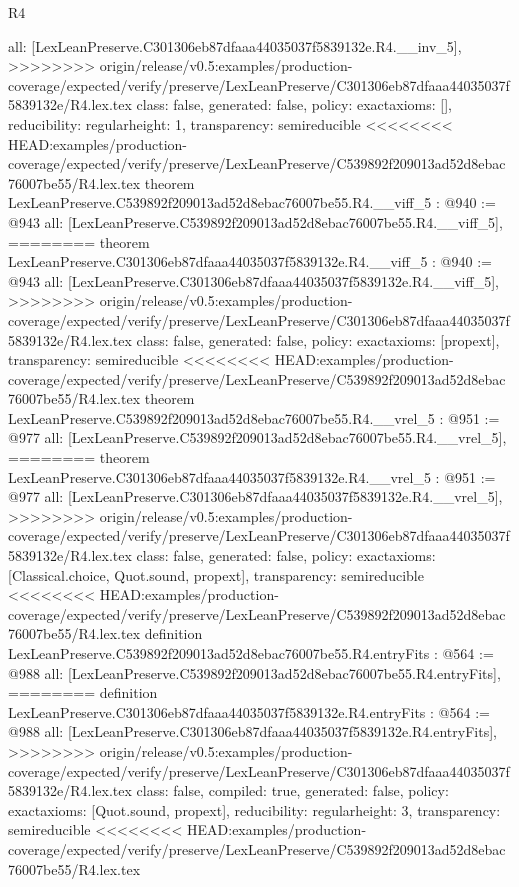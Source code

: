 \begin{lexlean}{R4}
\begin{coremodule}
{{{{{{{{{{{{  all: [LexLeanPreserve.C301306eb87dfaaa44035037f5839132e.R4.__inv_5],
>>>>>>>> origin/release/v0.5:examples/production-coverage/expected/verify/preserve/LexLeanPreserve/C301306eb87dfaaa44035037f5839132e/R4.lex.tex
  class: false,
  generated: false,
  policy: exact{axioms: []},
  reducibility: regular{height: 1},
  transparency: semireducible
}
<<<<<<<< HEAD:examples/production-coverage/expected/verify/preserve/LexLeanPreserve/C539892f209013ad52d8ebac76007be55/R4.lex.tex
theorem LexLeanPreserve.C539892f209013ad52d8ebac76007be55.R4.__viff_5 : @940 := @943 {
  all: [LexLeanPreserve.C539892f209013ad52d8ebac76007be55.R4.__viff_5],
========
theorem LexLeanPreserve.C301306eb87dfaaa44035037f5839132e.R4.__viff_5 : @940 := @943 {
  all: [LexLeanPreserve.C301306eb87dfaaa44035037f5839132e.R4.__viff_5],
>>>>>>>> origin/release/v0.5:examples/production-coverage/expected/verify/preserve/LexLeanPreserve/C301306eb87dfaaa44035037f5839132e/R4.lex.tex
  class: false,
  generated: false,
  policy: exact{axioms: [propext]},
  transparency: semireducible
}
<<<<<<<< HEAD:examples/production-coverage/expected/verify/preserve/LexLeanPreserve/C539892f209013ad52d8ebac76007be55/R4.lex.tex
theorem LexLeanPreserve.C539892f209013ad52d8ebac76007be55.R4.__vrel_5 : @951 := @977 {
  all: [LexLeanPreserve.C539892f209013ad52d8ebac76007be55.R4.__vrel_5],
========
theorem LexLeanPreserve.C301306eb87dfaaa44035037f5839132e.R4.__vrel_5 : @951 := @977 {
  all: [LexLeanPreserve.C301306eb87dfaaa44035037f5839132e.R4.__vrel_5],
>>>>>>>> origin/release/v0.5:examples/production-coverage/expected/verify/preserve/LexLeanPreserve/C301306eb87dfaaa44035037f5839132e/R4.lex.tex
  class: false,
  generated: false,
  policy: exact{axioms: [Classical.choice, Quot.sound, propext]},
  transparency: semireducible
}
<<<<<<<< HEAD:examples/production-coverage/expected/verify/preserve/LexLeanPreserve/C539892f209013ad52d8ebac76007be55/R4.lex.tex
definition LexLeanPreserve.C539892f209013ad52d8ebac76007be55.R4.entryFits : @564 := @988 {
  all: [LexLeanPreserve.C539892f209013ad52d8ebac76007be55.R4.entryFits],
========
definition LexLeanPreserve.C301306eb87dfaaa44035037f5839132e.R4.entryFits : @564 := @988 {
  all: [LexLeanPreserve.C301306eb87dfaaa44035037f5839132e.R4.entryFits],
>>>>>>>> origin/release/v0.5:examples/production-coverage/expected/verify/preserve/LexLeanPreserve/C301306eb87dfaaa44035037f5839132e/R4.lex.tex
  class: false,
  compiled: true,
  generated: false,
  policy: exact{axioms: [Quot.sound, propext]},
  reducibility: regular{height: 3},
  transparency: semireducible
}
<<<<<<<< HEAD:examples/production-coverage/expected/verify/preserve/LexLeanPreserve/C539892f209013ad52d8ebac76007be55/R4.lex.tex
}}}}}}}}}}}}}}
\end{coremodule}
\end{lexlean}
